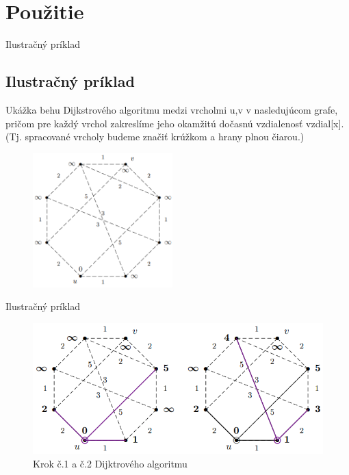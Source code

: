 \documentclass[15pt]{beamer}
\begin{document}
\section{Použitie}
\begin{frame}{Ilustračný príklad}
	\subsection{Ilustračný príklad}
	Ukážka behu Dijkstrového algoritmu medzi vrcholmi u,v v nasledujúcom grafe, pričom pre každý vrchol zakreslíme jeho okamžitú dočasnú vzdialenosť vzdial[x]. (Tj. spracované vrcholy budeme
	značiť krúžkom a hrany plnou čiarou.)
	\begin{figure}
		\centering
		\includegraphics[width=0.48\textwidth]{imgs/dijkstra1.png}
		\label{fig:dijkstra1}
	\end{figure}
\end{frame}

\begin{frame}{Ilustračný príklad}
	\begin{figure}
		\centering
		\includegraphics{imgs/dijkstra2.png}
		\caption{Krok č.1 a č.2 Dijktrového algoritmu}
		\label{fig:dijkstra2}
	\end{figure}
\end{frame}
\end{document}
